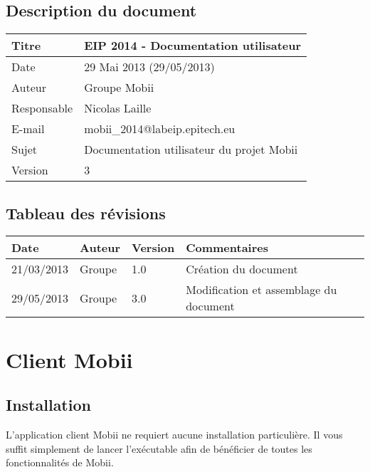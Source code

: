 \documentclass{koala-fr}
\begin{document}
\newpage
\thispagestyle{empty}

\section*{Description du document}
\begin{tabular}{|l|l|}
  \hline \cellcolor{lightgray}Titre & EIP 2014 - Documentation utilisateur \\
  \hline \cellcolor{lightgray}Date & 29 Mai 2013 (29/05/2013) \\
  \hline \cellcolor{lightgray}Auteur & Groupe Mobii \\
  \hline \cellcolor{lightgray}Responsable & Nicolas Laille \\
  \hline \cellcolor{lightgray}E-mail & mobii\_2014@labeip.epitech.eu \\
  \hline \cellcolor{lightgray}Sujet & Documentation utilisateur du projet Mobii \\
  \hline \cellcolor{lightgray}Version & 3 \\
  \hline
\end{tabular}

\section*{Tableau des révisions}
\begin{tabular}{|l|l|l|m{8cm}|}
  \hline \rowcolor{lightgray} Date & Auteur & Version & Commentaires \\
  \hline
  \hline 21/03/2013 & Groupe & 1.0 & Création du document \\
  \hline 29/05/2013 & Groupe & 3.0 & Modification et assemblage du document \\
  \hline
\end{tabular}

\newpage

\tableofcontents

\thispagestyle{fancy}
\newpage

\chapter{Client Mobii}
\section{Installation}
L’application client Mobii ne requiert aucune installation particulière. Il vous suffit simplement de lancer l’exécutable afin de bénéficier de toutes les fonctionnalités de Mobii.
\end{document}
